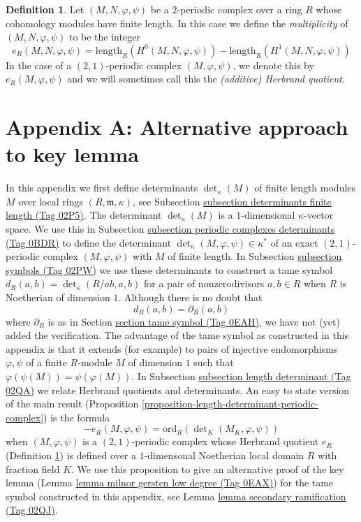 \documentclass{amsart}
\theoremstyle{plain}
\theoremstyle{definition}
\newtheorem{definition}[subsection]{Definition}
\theoremstyle{remark}
\numberwithin{equation}{subsection}
\begin{document}
\begin{definition}
\label{definition-periodic-length}
Let $(M, N, \varphi, \psi)$ be a $2$-periodic complex
over a ring $R$ whose cohomology modules have finite length.
In this case we define the {\it multiplicity} of $(M, N, \varphi, \psi)$
to be the integer
$$
e_R(M, N, \varphi, \psi) =
\text{length}_R(H^0(M, N, \varphi, \psi))
-
\text{length}_R(H^1(M, N, \varphi, \psi))
$$
In the case of a $(2, 1)$-periodic complex $(M, \varphi, \psi)$,
we denote this by $e_R(M, \varphi, \psi)$ and we will sometimes call this
the {\it (additive) Herbrand quotient}.
\end{definition}

\section{Appendix A: Alternative approach to key lemma}
\label{section-appendix-A}

\noindent
In this appendix we first define determinants $\det_\kappa(M)$
of finite length modules $M$ over local rings $(R, \mathfrak m, \kappa)$,
see Subsection \href{https://stacks.math.columbia.edu/tag/02P5}{subsection determinants finite length (Tag 02P5)}.
The determinant $\det_\kappa(M)$ is a $1$-dimensional $\kappa$-vector space.
We use this in Subsection \href{https://stacks.math.columbia.edu/tag/0BDR}{subsection periodic complexes determinants (Tag 0BDR)}
to define the determinant $\det_\kappa(M, \varphi, \psi) \in \kappa^*$
of an exact $(2, 1)$-periodic complex $(M, \varphi, \psi)$
with $M$ of finite length. In Subsection \href{https://stacks.math.columbia.edu/tag/02PW}{subsection symbols (Tag 02PW)}
we use these determinants to construct a tame symbol
$d_R(a, b) = \det_\kappa(R/ab, a, b)$ for a pair of nonzerodivisors
$a, b \in R$ when $R$ is Noetherian of dimension $1$.
Although there is no doubt that
$$
d_R(a, b) = \partial_R(a, b)
$$
where $\partial_R$ is as in Section \href{https://stacks.math.columbia.edu/tag/0EAH}{section tame symbol (Tag 0EAH)},
we have not (yet) added the verification. The advantage of the
tame symbol as constructed in this appendix is that it extends
(for example) to pairs of injective endomorphisms $\varphi, \psi$
of a finite $R$-module $M$ of dimension $1$ such that
$\varphi(\psi(M)) = \psi(\varphi(M))$. In
Subsection \href{https://stacks.math.columbia.edu/tag/02QA}{subsection length determinant (Tag 02QA)}
we relate Herbrand quotients and determinants.
An easy to state version of the main result
(Proposition \ref{proposition-length-determinant-periodic-complex})
is the formula
$$
-e_R(M, \varphi, \psi) =
\text{ord}_R(\det\nolimits_K(M_K, \varphi, \psi))
$$
when $(M, \varphi, \psi)$ is a $(2, 1)$-periodic complex
whose Herbrand quotient $e_R$ (Definition \ref{definition-periodic-length})
is defined
over a $1$-dimensonal Noetherian local domain $R$ with fraction field $K$.
We use this proposition to give an alternative proof of the key lemma
(Lemma \href{https://stacks.math.columbia.edu/tag/0EAX}{lemma milnor gersten low degree (Tag 0EAX)})
for the tame symbol constructed in this appendix, see
Lemma \href{https://stacks.math.columbia.edu/tag/02QJ}{lemma secondary ramification (Tag 02QJ)}.
\end{document}
